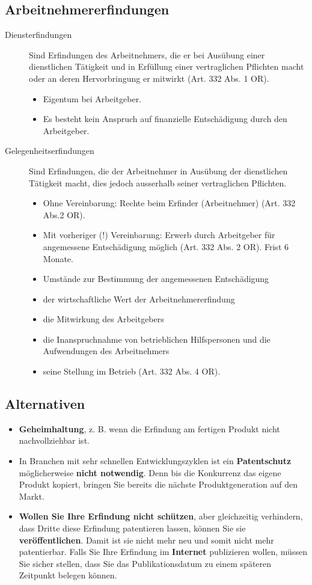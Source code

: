 \subsection{Arbeitnehmererfindungen}
\label{sec:Patentrecht-Arbeitnehmererfindungen}
\begin{description}
	\item[Diensterfindungen] Sind Erfindungen des Arbeitnehmers, die er
	bei Ausübung einer dienstlichen Tätigkeit und in Erfüllung einer
	vertraglichen Pflichten macht oder an deren Hervorbringung er mitwirkt
	(Art. 332 Abs. 1 OR).
	\begin{itemize}
		\item Eigentum bei Arbeitgeber.
		\item Es besteht kein Anspruch auf finanzielle Entschädigung
		durch den Arbeitgeber.
	\end{itemize}
	\item[Gelegenheitserfindungen] Sind Erfindungen, die der Arbeitnehmer
	in Ausübung der dienstlichen Tätigkeit macht, dies jedoch ausserhalb
	seiner vertraglichen Pflichten.
	\begin{itemize}
		\tightlist
		\item Ohne Vereinbarung: Rechte beim Erfinder (Arbeitnehmer) (Art. 332 Abs.2
		OR).
		\item Mit vorheriger (!) Vereinbarung: Erwerb durch Arbeitgeber für
		angemessene Entschädigung möglich (Art. 332 Abs. 2 OR). Frist 6
		Monate.
		\item Umstände zur Bestimmung der angemessenen Entschädigung
		\item der wirtschaftliche Wert der Arbeitnehmererfindung
		\item die Mitwirkung des Arbeitgebers
		\item die Inanspruchnahme von betrieblichen Hilfspersonen und die
		Aufwendungen des Arbeitnehmers
		\item seine Stellung im Betrieb (Art. 332 Abs. 4 OR).
	\end{itemize}
\end{description}

\subsection{Alternativen}
\begin{itemize}
	\tightlist
	\item \textbf{Geheimhaltung}, z. B. wenn die Erfindung am fertigen Produkt
	nicht nachvollziehbar ist.
	\item In Branchen mit sehr schnellen Entwicklungszyklen ist ein
	\textbf{Patentschutz} möglicherweise \textbf{nicht notwendig}.
	Denn bis die Konkurrenz das eigene Produkt kopiert, bringen Sie bereits die
	nächste Produktgeneration auf den Markt.
	\item \textbf{Wollen Sie Ihre Erfindung nicht schützen},
	aber gleichzeitig verhindern, dass Dritte diese Erfindung patentieren
	lassen, können Sie sie \textbf{veröffentlichen}.
	Damit ist sie nicht mehr neu und somit nicht mehr patentierbar.
	Falls Sie Ihre Erfindung im \textbf{Internet} publizieren wollen,
	müssen Sie sicher stellen, dass Sie das Publikationsdatum zu einem späteren
	Zeitpunkt belegen können.
\end{itemize}
